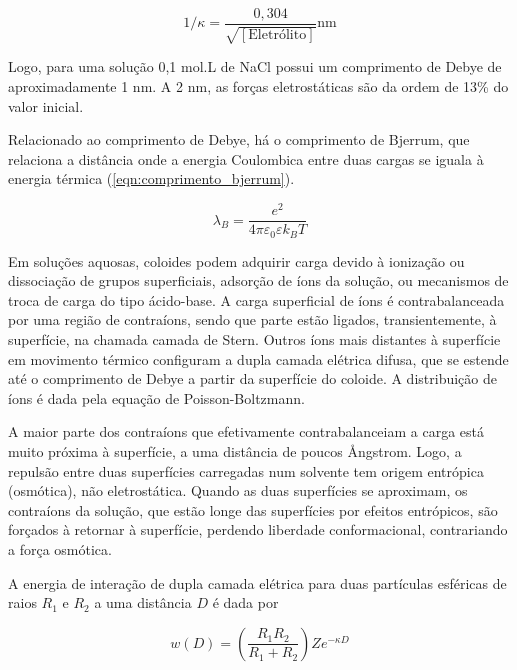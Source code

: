 	\begin{equation}
		1/\kappa = \dfrac{0{,}304}{\sqrt{\left[ \mathrm{Eletrólito} \right] }} \textrm{nm}
		\label{eqn:comprimento_debye}
	\end{equation} 
	
	Logo, para uma solução 0,1 mol.L\menosUm{} de NaCl possui um comprimento de Debye de aproximadamente 1 nm. A 2 nm, as forças eletrostáticas são da ordem de 13\% do valor inicial.
	
	Relacionado ao comprimento de Debye, há o comprimento de Bjerrum, que relaciona a distância onde a energia Coulombica entre duas cargas se iguala à energia térmica (\autoref{eqn:comprimento_bjerrum}).
	
	\begin{equation}
		\lambda_B = \dfrac{e^2}{4 \pi \varepsilon_{ 0 } \varepsilon k_BT}
		\label{eqn:comprimento_bjerrum}
	\end{equation} 
	
	Em soluções aquosas, coloides podem adquirir carga devido à ionização ou dissociação de grupos superficiais, adsorção de íons da solução, ou mecanismos de troca de carga do tipo ácido-base. A carga superficial de íons é contrabalanceada por uma região de contraíons, sendo que parte estão ligados, transientemente, à superfície, na chamada camada de Stern.  Outros íons mais distantes à superfície em movimento térmico configuram a dupla camada elétrica difusa, que se estende até o comprimento de Debye a partir da superfície do coloide. A distribuição de íons é dada pela equação de Poisson-Boltzmann.
	
	A maior parte dos contraíons que efetivamente contrabalanceiam a carga está muito próxima à superfície, a uma distância de poucos \AA ngstrom. Logo, a repulsão entre duas superfícies carregadas num solvente tem origem entrópica (osmótica), não eletrostática. Quando as duas superfícies se aproximam, os contraíons da solução, que estão longe das superfícies por efeitos entrópicos, são forçados à retornar à superfície, perdendo liberdade conformacional, contrariando a força osmótica.
	
	A energia de interação de dupla camada elétrica para duas partículas esféricas de raios \(R_1\) e \(R_2\) a uma distância \(D\) é dada por
	
	\begin{equation}
		w(D) = \left(  \dfrac{R_1R_2}{R_1+R_2}  \right)Ze^{-\kappa D}
		\label{eqn:dupla_camada_esferas}
	\end{equation} 
	
